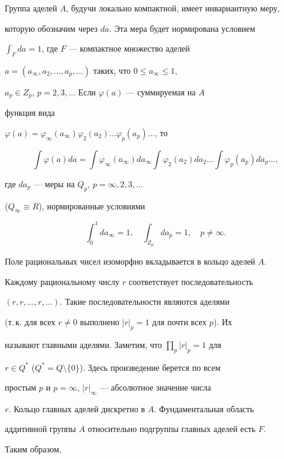  


Группа аделей $A$, будучи локально компактной, имеет инвариантную меру, 


которую обозначим через $da$. Эта мера будет нормирована условием 


$\displaystyle\int_F da=1$, где $F$ --- компактное множество аделей 


$a=(a_\infty,a_2,\dotsc,a_p,\dotsc)$ таких, что $0\le a_\infty\le1$, 


$a_p\in Z_p$, $p=2,3,\dotsc$ Если $\varphi(a)$ --- суммируемая на $A$ 


функция вида 


$\varphi(a)=\varphi_\infty(a_\infty)\varphi_2(a_2)


\dotsc\varphi_p(a_p)\dotsc$, то 


$$ 


\int\varphi(a)da=\int\varphi_\infty(a_\infty)da_\infty 


\int\varphi_2(a_2)da_2\dotsc\int\varphi_p(a_p)da_p\dotsc, 


$$ 


где $da_p$ --- меры на $Q_p$, $p=\infty,2,3,\dotsc$ 


($Q_\infty\equiv R$), нормированные условиями 


$$ 


\int^1_0 da_\infty=1,\quad \int_{Z_p}da_p=1,\quad p\ne\infty. 


$$ 


 


Поле рациональных чисел изоморфно вкладывается в кольцо аделей $A$. 


Каждому рациональному числу $r$ соответствует последовательность 


$(r,r,\dotsc,r,\dotsc)$. Такие последовательности являются аделями 


(т.\,к. для всех $r\ne0$ выполнено $|r|_p=1$ для почти всех $p$). Их 


называют главными аделями. Заметим, что $\prod\limits_p|r|_p=1$ для 


$r\in Q^*$ ($Q^*=Q\setminus\{0\}$). Здесь произведение берется по всем 


простым $p$ и $p=\infty$, $|r|_\infty$ --- абсолютное значение числа 


$r$. Кольцо главных аделей дискретно в $A$. Фундаментальная область 


аддитивной группы $A$ относительно подгруппы главных аделей есть $F$. 


Таким образом, 


